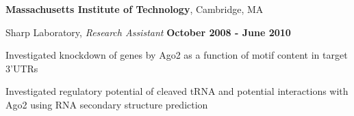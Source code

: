\documentclass[10pt]{article}
\newcommand{\halfblankline}{\quad\vspace{-0.5\baselineskip}\pagebreak[3]}
\begin{document}
\halfblankline

\textbf{Massachusetts Institute of Technology},
Cambridge, MA
\begin{outerlist}
\item[] Sharp Laboratory, \textit{Research Assistant}
\hfill \textbf{October 2008 - June 2010}
\begin{innerlist}
\item Investigated knockdown of genes by Ago2 as a function of motif content in target 3'UTRs
\item Investigated regulatory potential of cleaved tRNA and potential interactions with Ago2 using RNA secondary structure prediction
\end{innerlist}

%
\end{outerlist}

%
\end{document}
